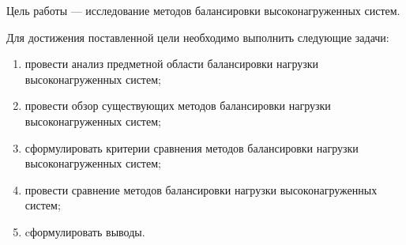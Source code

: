 Цель работы --- исследование методов балансировки высоконагруженных систем.

Для достижения поставленной цели необходимо выполнить следующие задачи:

\begin{enumerate}[label=---]
	\item провести анализ предметной области балансировки нагрузки высоконагруженных систем;
	\item провести обзор существующих методов балансировки нагрузки высоконагруженных систем;
	\item сформулировать критерии сравнения методов балансировки нагрузки высоконагруженных систем; 
	\item провести сравнение методов балансировки нагрузки высоконагруженных систем; 
	\item cформулировать выводы.
\end{enumerate}

